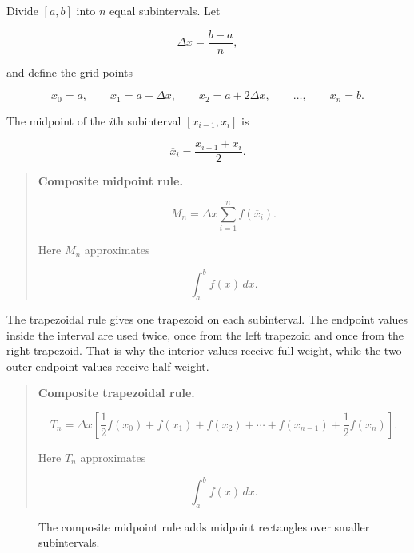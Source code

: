 Divide \([a,b]\) into \(n\) equal subintervals.  Let

\[
\Delta x=\frac{b-a}{n},
\]

and define the grid points

\[
x_0=a,\qquad x_1=a+\Delta x,\qquad x_2=a+2\Delta x,\qquad \ldots,\qquad x_n=b.
\]

The midpoint of the \(i\)th subinterval \([x_{i-1},x_i]\) is

\[
\overline{x}_i=\frac{x_{i-1}+x_i}{2}.
\]

\begin{quote}
\textbf{Composite midpoint rule.}

\[
\boxed{
M_n=\Delta x\sum_{i=1}^n f(\overline{x}_i).
}
\]

Here \(M_n\) approximates

\[
\int_a^b f(x)\,dx.
\]
\end{quote}

The trapezoidal rule gives one trapezoid on each subinterval.  The endpoint values inside
the interval are used twice, once from the left trapezoid and once from the right
trapezoid.  That is why the interior values receive full weight, while the two outer
endpoint values receive half weight.

\begin{quote}
\textbf{Composite trapezoidal rule.}

\[
\boxed{
T_n=
\Delta x\left[
\frac12 f(x_0)+f(x_1)+f(x_2)+\cdots+f(x_{n-1})+\frac12 f(x_n)
\right].
}
\]

Here \(T_n\) approximates

\[
\int_a^b f(x)\,dx.
\]
\end{quote}

\begin{figure}[h]
\centering
{}
\caption{The composite midpoint rule adds midpoint rectangles over smaller subintervals.}
\label{fig:composite-midpoint-exp}
\end{figure}

